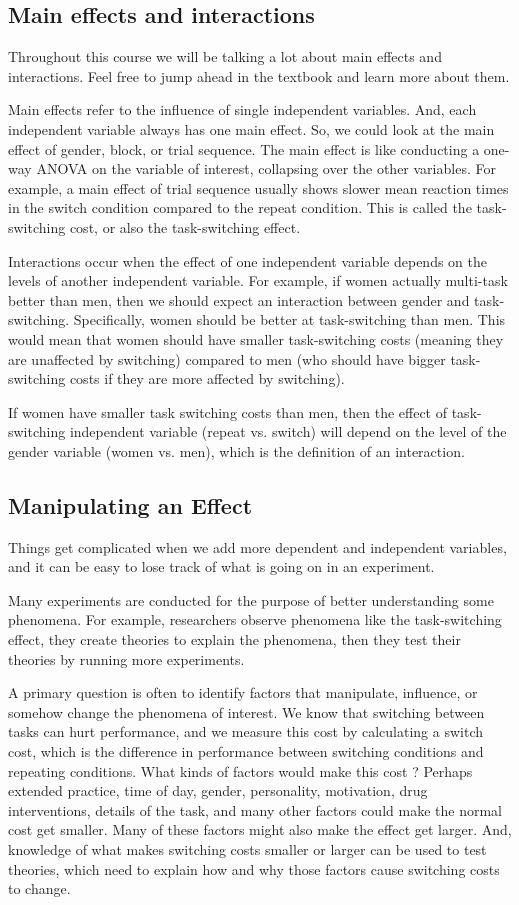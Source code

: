 \subsection{Main effects and interactions}
Throughout this course we will be talking a lot about main effects and interactions. Feel free to jump ahead in the textbook and learn more about them. 

Main effects refer to the influence of single independent variables. And, each independent variable always has one main effect. So, we could look at the main effect of gender, block, or trial sequence. The main effect is like conducting a one-way ANOVA on the variable of interest, collapsing over the other variables. For example, a main effect of trial sequence usually shows slower mean reaction times in the switch condition compared to the repeat condition. This is called the task-switching cost, or also the task-switching effect.

Interactions occur when the effect of one independent variable depends on the levels of another independent variable. For example, if women actually multi-task better than men, then we should expect an interaction between gender and task-switching. Specifically, women should be better at task-switching than men. This would mean that women should have smaller task-switching costs (meaning they are unaffected by switching) compared to men (who should have bigger task-switching costs if they are more affected by switching).

If women have smaller task switching costs than men, then the effect of task-switching independent variable (repeat vs. switch) will depend on the level of the gender variable (women vs. men), which is the definition of an interaction.

\subsection{Manipulating an Effect}

Things get complicated when we add more dependent and independent variables, and it can be easy to lose track of what is going on in an experiment.

Many experiments are conducted for the purpose of better understanding some phenomena. For example, researchers observe phenomena like the task-switching effect, they create theories to explain the phenomena, then they test their theories by running more experiments. 

A primary question is often to identify factors that manipulate, influence, or somehow change the phenomena of interest. We know that switching between tasks can hurt performance, and we measure this cost by calculating a switch cost, which is the difference in performance between switching conditions and repeating conditions. What kinds of factors would make this cost ? Perhaps extended practice, time of day, gender, personality, motivation, drug interventions, details of the task, and many other factors could make the normal cost get smaller. Many of these factors might also make the effect get larger. And, knowledge of what makes switching costs smaller or larger can be used to test theories, which need to explain how and why those factors cause switching costs to change. 


